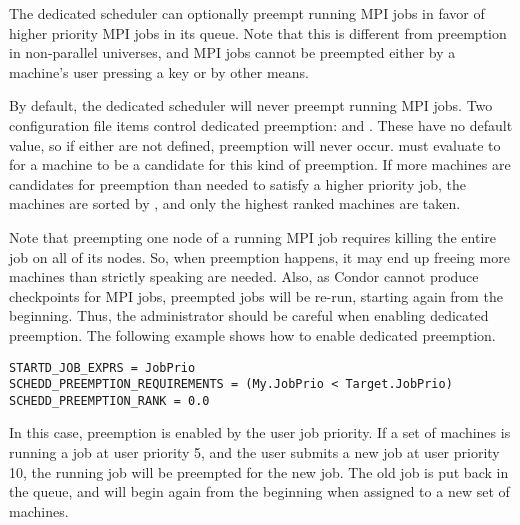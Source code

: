 The dedicated scheduler can optionally preempt running MPI jobs in
favor of higher priority MPI jobs in its queue.  Note that this is
different from preemption in non-parallel universes, and MPI jobs cannot
be preempted either by a machine's user pressing a key or by other means.

By default, the dedicated scheduler will never preempt running MPI jobs.
Two configuration file items control dedicated preemption: 
 and .
These have no default value, so if either are not defined, preemption will
never occur.  must evaluate to 
for a machine to be a candidate for this kind of preemption.
If more machines are 
candidates for preemption than needed to satisfy a higher priority job, the
machines are sorted by , and
only the highest ranked machines are taken.

Note that preempting one node of a running MPI job requires killing
the entire job on all of its nodes.  So, when preemption happens, it
may end up freeing more machines than strictly speaking are needed.
Also, as Condor cannot produce checkpoints for MPI jobs,
preempted jobs will be re-run, starting again from the beginning.
Thus, the administrator should be careful when
enabling dedicated preemption.  The following example shows how to
enable dedicated preemption.

\begin{verbatim}
STARTD_JOB_EXPRS = JobPrio
SCHEDD_PREEMPTION_REQUIREMENTS = (My.JobPrio < Target.JobPrio)
SCHEDD_PREEMPTION_RANK = 0.0
\end{verbatim}

In this case, preemption is enabled by the user job priority. If a set
of machines is running a job at user priority 5, and the user submits
a new job at user priority 10, the running job will be preempted for
the new job.  The old job is put back in the queue, and will begin again
from the beginning when assigned to a new set of machines.

